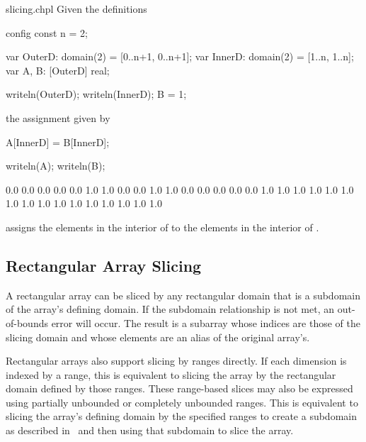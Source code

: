 \begin{chapelexample}{slicing.chpl}
Given the definitions
\begin{chapelpre}
config const n = 2;
\end{chapelpre}
\begin{chapel}
var OuterD: domain(2) = [0..n+1, 0..n+1];
var InnerD: domain(2) = [1..n, 1..n];
var A, B: [OuterD] real;
\end{chapel}
\begin{chapelnoprint}
writeln(OuterD);
writeln(InnerD);
B = 1;
\end{chapelnoprint}
the assignment given by
\begin{chapel}
A[InnerD] = B[InnerD];
\end{chapel}
\begin{chapelpost}
writeln(A);
writeln(B);
\end{chapelpost}
\begin{chapeloutput}
[0..3, 0..3]
[1..2, 1..2]
0.0 0.0 0.0 0.0
0.0 1.0 1.0 0.0
0.0 1.0 1.0 0.0
0.0 0.0 0.0 0.0
1.0 1.0 1.0 1.0
1.0 1.0 1.0 1.0
1.0 1.0 1.0 1.0
1.0 1.0 1.0 1.0
\end{chapeloutput}
assigns the elements in the interior of  to the elements in
the interior of .
\end{chapelexample}

\subsection{Rectangular Array Slicing}
\label{Rectangular_Array_Slicing}

A rectangular array can be sliced by any rectangular domain that is a
subdomain of the array's defining domain.  If the subdomain
relationship is not met, an out-of-bounds error will occur.  The
result is a subarray whose indices are those of the slicing domain and
whose elements are an alias of the original array's.

Rectangular arrays also support slicing by ranges directly.  If each
dimension is indexed by a range, this is equivalent to slicing the
array by the rectangular domain defined by those ranges.  These
range-based slices may also be expressed using partially unbounded or
completely unbounded ranges.  This is equivalent to slicing the
array's defining domain by the specified ranges to create a subdomain
as described in~ and then using that subdomain to slice
the array.

